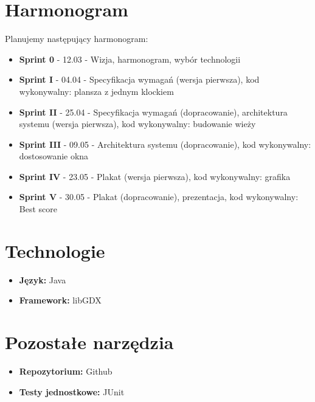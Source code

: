 \documentclass{article}
\begin{document}
\section{Harmonogram}
Planujemy następujący harmonogram:
\begin{itemize}
\item\textbf{Sprint 0} - 12.03 - Wizja, harmonogram, wybór technologii
\item\textbf{Sprint I} - 04.04 - Specyfikacja wymagań (wersja pierwsza), kod wykonywalny: plansza z jednym klockiem
\item\textbf{Sprint II} - 25.04 - Specyfikacja wymagań (dopracowanie), architektura systemu (wersja pierwsza), kod wykonywalny: budowanie wieży
\item\textbf{Sprint III} - 09.05 - Architektura systemu (dopracowanie), kod wykonywalny: dostosowanie okna
\item\textbf{Sprint IV} - 23.05 - Plakat (wersja pierwsza), kod wykonywalny: grafika
\item\textbf{Sprint V} - 30.05 - Plakat (dopracowanie), prezentacja, kod wykonywalny: Best score
\end{itemize}

\section{Technologie}
\begin{itemize}
\item\textbf{Język:} Java
\item\textbf{Framework:} libGDX
\end{itemize}


\section{Pozostałe narzędzia}
\begin{itemize}
\item\textbf{Repozytorium:} Github
\item\textbf{Testy jednostkowe:} JUnit
\end{itemize}  
  
\end{document}
